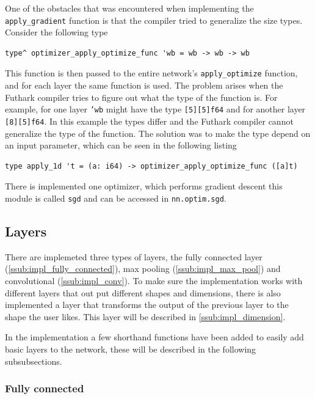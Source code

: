 One of the obstacles that was encountered when implementing the \\%
\texttt{apply\_gradient} function is that the compiler tried to generalize the size types. Consider the following type
\begin{lstlisting}
type^ optimizer_apply_optimize_func 'wb = wb -> wb -> wb
\end{lstlisting}
This function is then passed to the entire network's \texttt{apply\_optimize} function, and for each layer the same function is used.
The problem arises when the Futhark compiler tries to figure out what the type of the function is.
For example, for one layer \texttt{'wb} might have the type \texttt{[5][5]f64} and for another layer \texttt{[8][5]f64}.
In this example the types differ and the Futhark compiler cannot generalize the type of the function.
The solution was to make the type depend on an input parameter, which can be seen in the following listing
\begin{lstlisting}
type apply_1d 't = (a: i64) -> optimizer_apply_optimize_func ([a]t)
\end{lstlisting}

There is implemented one optimizer, which performs gradient descent this module is called \texttt{sgd} and can be accessed in \texttt{nn.optim.sgd}.

\subsection{Layers}%
\label{sub:layers}

There are implemeted three types of layers, the fully connected layer (\autoref{ssub:impl_fully_connected}), max pooling (\autoref{ssub:impl_max_pool}) and convolutional (\autoref{ssub:impl_conv}).
To make sure the implementation works with different layers that out put different shapes and dimensions, there is also implemented a layer that transforms the output of the previous layer to the shape the user likes. This layer will be described in \autoref{ssub:impl_dimension}.

In the implementation a few shorthand functions have been added to easily add basic layers to the network, these will be described in the following subsubsections.

\subsubsection{Fully connected}%
\label{ssub:impl_fully_connected}

